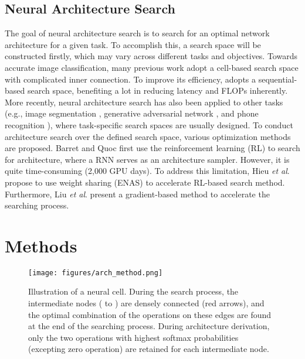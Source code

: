 \documentclass[a4paper]{article}
\newcommand{\etal}{\textit{et al}. }
\begin{document}
\subsection{Neural Architecture Search}
The goal of neural architecture search is to search for an optimal network architecture for a given task. To accomplish this, a search space will be constructed firstly, which may vary across different tasks and objectives. Towards accurate image classification, many previous work \cite{liu2018darts,real2019regularized,pham2018efficient} adopt a cell-based search space with complicated inner connection. To improve its efficiency, \cite{tan2019mnasnet,wu2019fbnet,dai2019chamnet} adopts a sequential-based search space, benefiting a lot in reducing latency and FLOPs inherently. More recently, neural architecture search has also been applied to other tasks (e.g., image segmentation \cite{liu2019auto, chen2019fasterseg}, generative adversarial network \cite{gong2019autogan}, and phone recognition \cite{baruwa2019leveraging}), where task-specific search spaces are usually designed. To conduct architecture search over the defined search space, various optimization methods are proposed. Barret and Quoc first use the reinforcement learning (RL) to search for architecture\cite{zoph2016neural}, where a RNN serves as an architecture sampler. However, it is quite time-consuming (2,000 GPU days). To address this limitation, Hieu \etal propose to use weight sharing (ENAS\cite{pham2018efficient}) to accelerate RL-based search method. Furthermore, Liu \etal present a gradient-based method \cite{liu2018darts} to accelerate the searching process.




\section{Methods}
\label{sec:methods}

\begin{figure}
	\centering
	\texttt{[image: figures/arch\_method.png]}
	\vspace{-1em}
	\caption{Illustration of a neural cell. During the search process, the intermediate nodes ( to ) are densely connected (red arrows), and the optimal combination of the operations on these edges are found at the end of the searching process. During architecture derivation, only the two operations with highest softmax probabilities (excepting zero operation) are retained for each intermediate node.}
	\vspace{-1em}
	\label{fig:neural_cell}
\end{figure}
\end{document}

